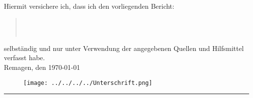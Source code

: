 Hiermit versichere ich, dass ich den vorliegenden Bericht:
\begin{quote}
\textit{\titel} \\ 
\textit{\untertitel} \\
\end{quote}
selbständig und nur unter Verwendung der angegebenen Quellen und Hilfsmittel verfasst habe.\\
Remagen, den \today
\begin{figure}[hp]
	\texttt{[image: ../../../../Unterschrift.png]}
\end{figure}

\rule{5cm}{0.5pt}\\
\textsc{\autor} 
